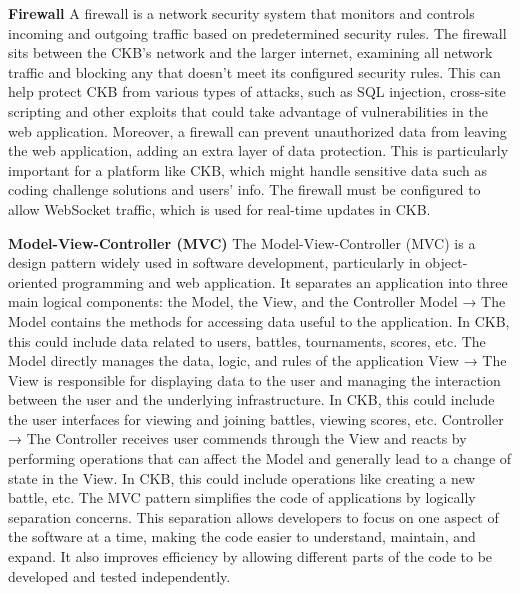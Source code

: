 \textbf{Firewall}
A firewall is a network security system that monitors and controls incoming and outgoing traffic based on predetermined security rules. 
The firewall sits between the CKB’s network and the larger internet, examining all network traffic and blocking any 
that doesn’t meet its configured security rules. This can help protect CKB from various types of attacks, 
such as SQL injection, cross-site scripting and other exploits that could take advantage of vulnerabilities in the web application. 
Moreover, a firewall can prevent unauthorized data from leaving the web application, adding an extra layer of data protection. 
This is particularly important for a platform like CKB, which might handle sensitive data such as coding challenge solutions and users’ info. 
The firewall must be configured to allow WebSocket traffic, which is used for real-time updates in CKB.


\textbf{Model-View-Controller (MVC)}
The Model-View-Controller (MVC) is a design pattern widely used in software development, particularly in object-oriented programming and web application. 
It separates an application into three main logical components: the Model, the View, and the Controller\newline
Model → The Model contains the methods for accessing data useful to the application. 
In CKB, this could include data related to users, battles, tournaments, scores, etc. The Model directly manages the data, logic, and rules of the application\newline
View → The View is responsible for displaying data to the user and managing the interaction between the user and the underlying infrastructure. 
In CKB, this could include the user interfaces for viewing and joining battles, viewing scores, etc.\newline
Controller → The Controller receives user commends through the View and reacts by performing operations that can affect the Model and 
generally lead to a change of state in the View. In CKB, this could include operations like creating a new battle, etc.\newline
The MVC pattern simplifies the code of applications by logically separation concerns. 
This separation allows developers to focus on one aspect of the software at a time, making the code easier to understand, maintain, and expand. 
It also improves efficiency by allowing different parts of the code to be developed and tested independently.

